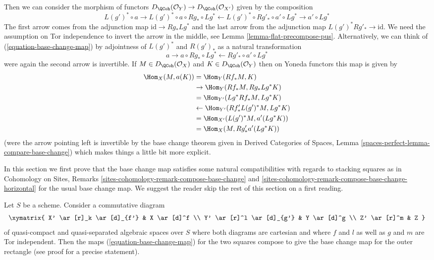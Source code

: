\noindent
Then we can consider the
morphism of functors
$D_\QCoh(\mathcal{O}_Y) \to D_\QCoh(\mathcal{O}_{X'})$
given by the composition
\begin{equation}
\label{equation-base-change-map}
L(g')^* \circ a \to
L(g')^* \circ a \circ Rg_* \circ Lg^* \leftarrow
L(g')^* \circ Rg'_* \circ a' \circ Lg^* \to a' \circ Lg^*
\end{equation}
The first arrow comes from the adjunction map $\text{id} \to Rg_* Lg^*$
and the last arrow from the adjunction map $L(g')^*Rg'_* \to \text{id}$.
We need the assumption on Tor independence to invert the arrow
in the middle, see Lemma \ref{lemma-flat-precompose-pus}.
Alternatively, we can think of (\ref{equation-base-change-map}) by
adjointness of $L(g')^*$ and $R(g')_*$ as a natural transformation
$$
a \to a \circ Rg_* \circ Lg^* \leftarrow Rg'_* \circ a' \circ Lg^*
$$
were again the second arrow is invertible. If $M \in D_\QCoh(\mathcal{O}_X)$
and $K \in D_\QCoh(\mathcal{O}_Y)$
then on Yoneda functors this map is given by
\begin{align*}
\Hom_X(M, a(K))
& =
\Hom_Y(Rf_*M, K) \\
& \to
\Hom_Y(Rf_*M, Rg_* Lg^*K) \\
& =
\Hom_{Y'}(Lg^*Rf_*M, Lg^*K) \\
& \leftarrow
\Hom_{Y'}(Rf'_* L(g')^*M, Lg^*K) \\
& =
\Hom_{X'}(L(g')^*M, a'(Lg^*K)) \\
& =
\Hom_X(M, Rg'_*a'(Lg^*K))
\end{align*}
(were the arrow pointing left is invertible by the base
change theorem given in
Derived Categories of Spaces, Lemma
\ref{spaces-perfect-lemma-compare-base-change})
which makes things a little bit more explicit.

\medskip\noindent
In this section we first prove that the base change map satisfies
some natural compatibilities with regards to stacking squares as in
Cohomology on Sites, Remarks
\ref{sites-cohomology-remark-compose-base-change} and
\ref{sites-cohomology-remark-compose-base-change-horizontal}
for the usual base change map.
We suggest the reader skip the rest of this section on a first reading.

\begin{lemma}
\label{lemma-compose-base-change-maps}
Let $S$ be a scheme. Consider a commutative diagram
$$
\xymatrix{
X' \ar[r]_k \ar[d]_{f'} & X \ar[d]^f \\
Y' \ar[r]^l \ar[d]_{g'} & Y \ar[d]^g \\
Z' \ar[r]^m & Z
}
$$
of quasi-compact and quasi-separated algebraic spaces over $S$ where
both diagrams are cartesian and where $f$ and $l$
as well as $g$ and $m$ are Tor independent.
Then the maps (\ref{equation-base-change-map})
for the two squares compose to give the base
change map for the outer rectangle (see proof for a precise statement).
\end{lemma}

